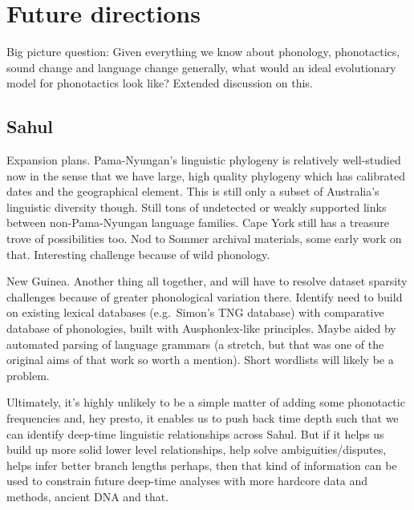 \hypertarget{future-directions}{%
\section{Future directions}\label{future-directions}}

Big picture question: Given everything we know about phonology, phonotactics, sound change and language change generally, what would an ideal evolutionary model for phonotactics look like? Extended discussion on this.

\hypertarget{sahul}{%
\subsection{Sahul}\label{sahul}}

Expansion plans. Pama-Nyungan's linguistic phylogeny is relatively well-studied now in the sense that we have large, high quality phylogeny which has calibrated dates and the geographical element. This is still only a subset of Australia's linguistic diversity though. Still tons of undetected or weakly supported links between non-Pama-Nyungan language families. Cape York still has a treasure trove of possibilities too. Nod to Sommer archival materials, some early work on that. Interesting challenge because of wild phonology.

New Guinea. Another thing all together, and will have to resolve dataset sparsity challenges because of greater phonological variation there. Identify need to build on existing lexical databases (e.g.~Simon's TNG database) with comparative database of phonologies, built with Ausphonlex-like principles. Maybe aided by automated parsing of language grammars (a stretch, but that was one of the original aims of that work so worth a mention). Short wordlists will likely be a problem.

Ultimately, it's highly unlikely to be a simple matter of adding some phonotactic frequencies and, hey presto, it enables us to push back time depth such that we can identify deep-time linguistic relationships across Sahul. But if it helps us build up more solid lower level relationships, help solve ambiguities/disputes, helps infer better branch lengths perhaps, then that kind of information can be used to constrain future deep-time analyses with more hardcore data and methods, ancient DNA and that.


